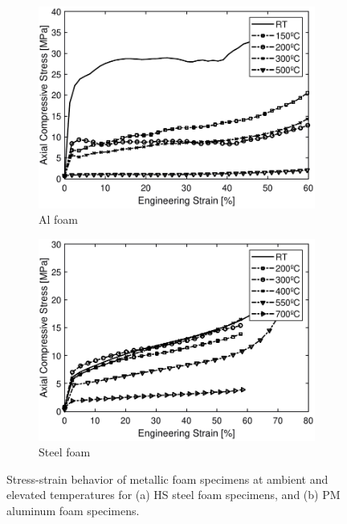 \documentclass[review]{elsarticle}
\begin{document}
\begin{figure}
	\centering
	\begin{subfigure}{.5\textwidth}
		\centering
		\includegraphics[width=0.98\linewidth]{Tex-Figures/Fig08a.pdf}
		\caption{Al foam}
		\label{fig8:sub1}
	\end{subfigure}%
	\begin{subfigure}{.5\textwidth}
		\centering
		\includegraphics[width=0.98\linewidth]{Tex-Figures/Fig08b.pdf}
		\caption{Steel foam}
		\label{fig8:sub2}
	\end{subfigure}
	\caption{Stress-strain behavior of metallic foam specimens at ambient and elevated temperatures for (a) HS steel foam specimens, and (b) PM aluminum foam specimens.}
	\label{fig:FoamStrStr}
\end{figure}
\end{document}
